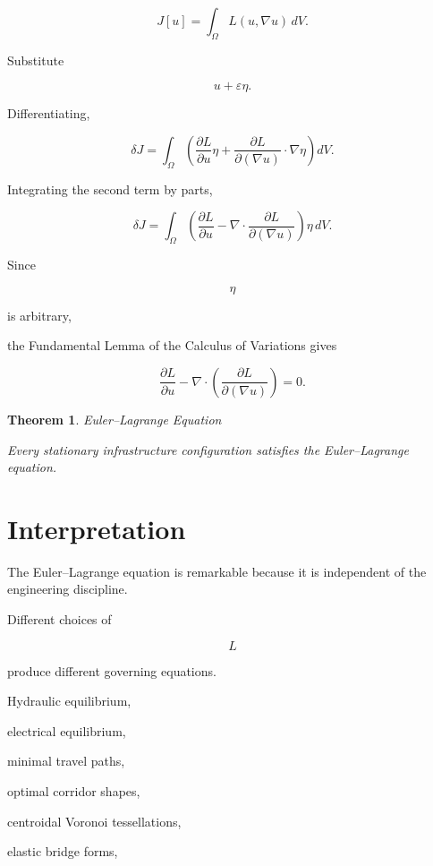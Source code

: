 \documentclass[11pt,fleqn]{book}
\numberwithin{equation}{chapter}
\theoremstyle{plain}
\newtheorem{theorem}{Theorem}[chapter]
\theoremstyle{definition}
\theoremstyle{remark}
\begin{document}
\[
J[u]
=
\int_\Omega
L(u,\nabla u)\,dV.
\]

Substitute

\[
u+\varepsilon\eta.
\]

Differentiating,

\[
\delta J
=
\int_\Omega
\left(
\frac{\partial L}{\partial u}\eta
+
\frac{\partial L}{\partial(\nabla u)}
\cdot
\nabla\eta
\right)
dV.
\]

Integrating the second term by parts,

\[
\delta J
=
\int_\Omega
\left(
\frac{\partial L}{\partial u}
-
\nabla\cdot
\frac{\partial L}
{\partial(\nabla u)}
\right)
\eta
\,dV.
\]

Since

\[
\eta
\]

is arbitrary,

the Fundamental Lemma of the Calculus of Variations gives

\[
\boxed{
\frac{\partial L}{\partial u}
-
\nabla\cdot
\left(
\frac{\partial L}
{\partial(\nabla u)}
\right)
=
0.
}
\]


\begin{theorem}{Euler--Lagrange Equation}

Every stationary infrastructure configuration satisfies the
Euler--Lagrange equation.

\end{theorem}


\section{Interpretation}

The Euler--Lagrange equation is remarkable because it is independent of
the engineering discipline.

Different choices of

\[
L
\]

produce different governing equations.

Hydraulic equilibrium,

electrical equilibrium,

minimal travel paths,

optimal corridor shapes,

centroidal Voronoi tessellations,

elastic bridge forms,
\end{document}
